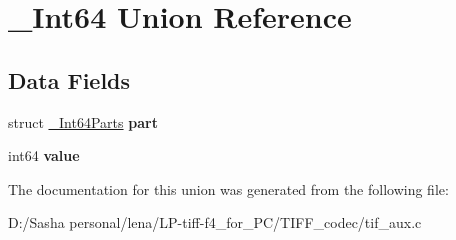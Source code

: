 \hypertarget{union___int64}{}\section{\+\_\+\+Int64 Union Reference}
\label{union___int64}
\subsection*{Data Fields}
\begin{DoxyCompactItemize}
\item 
\hypertarget{union___int64_a3fb334b09a68c0e4657452b150711b49}{}struct \hyperlink{struct___int64_parts}{\+\_\+\+Int64\+Parts} {\bfseries part}\label{union___int64_a3fb334b09a68c0e4657452b150711b49}

\item 
\hypertarget{union___int64_a21edc7ca4cc5802c8779d68556bc09cf}{}int64 {\bfseries value}\label{union___int64_a21edc7ca4cc5802c8779d68556bc09cf}

\end{DoxyCompactItemize}


The documentation for this union was generated from the following file\+:\begin{DoxyCompactItemize}
\item 
D\+:/\+Sasha personal/lena/\+L\+P-\/tiff-\/f4\+\_\+for\+\_\+\+P\+C/\+T\+I\+F\+F\+\_\+codec/tif\+\_\+aux.\+c\end{DoxyCompactItemize}
